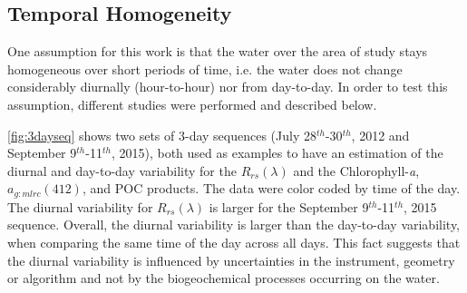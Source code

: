 \documentclass[onecolumn,3p,letterpaper,11pt]{elsarticle}
\begin{document}
\subsection{Temporal Homogeneity}
One assumption for this work is that the water over the area of study stays homogeneous over short periods of time, i.e. the water does not change considerably diurnally (hour-to-hour) nor from day-to-day. In order to test this assumption, different studies were performed and described below.

\autoref{fig:3dayseq} shows two sets of 3-day sequences (July 28$^{th}$-30$^{th}$, 2012 and September 9$^{th}$-11$^{th}$, 2015), both used as examples to have an estimation of the diurnal and day-to-day variability for the $R_{rs}(\lambda)$ and the Chlorophyll-{\it a}, $a_{g:mlrc}(412)$, and POC products. The data were color coded by time of the day. The diurnal variability for $R_{rs}(\lambda)$ is larger for the September 9$^{th}$-11$^{th}$, 2015 sequence. Overall, the diurnal variability is larger than the day-to-day variability, when comparing the same time of the day across all days. This fact suggests that the diurnal variability is influenced by uncertainties in the instrument, geometry or algorithm and not by the biogeochemical processes occurring on the water. 
\end{document}
